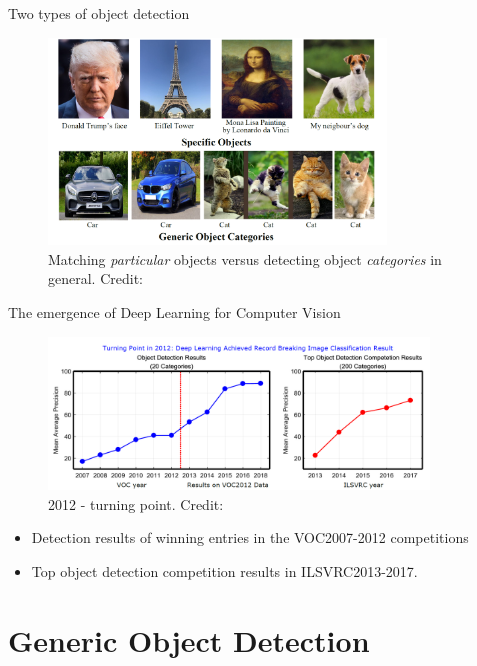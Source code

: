 \documentclass{beamer}
\begin{document}
\begin{frame}{Two types of object detection}
    \begin{figure}
        \includegraphics[width=0.8\textwidth]{images/two_types.PNG}
        \caption{Matching \emph{particular} objects versus detecting object \emph{categories} in general.
        \hbox{\scriptsize Credit:}
        }
    \end{figure}
\end{frame}

\begin{frame}{The emergence of Deep Learning for Computer Vision}
    \begin{figure}
        \includegraphics[width=0.9\textwidth]{images/turning_point.PNG}
        \caption{2012 - turning point. \hbox{\scriptsize Credit:}}
    \end{figure}
	\begin{itemize}
		\item Detection results of winning entries in the VOC2007-2012 competitions
		\item Top object detection competition results in ILSVRC2013-2017.
	\end{itemize}
\end{frame}

\part{Generic Object Detection}
\begin{frame}
	\partpage
\end{frame}
\end{document}
